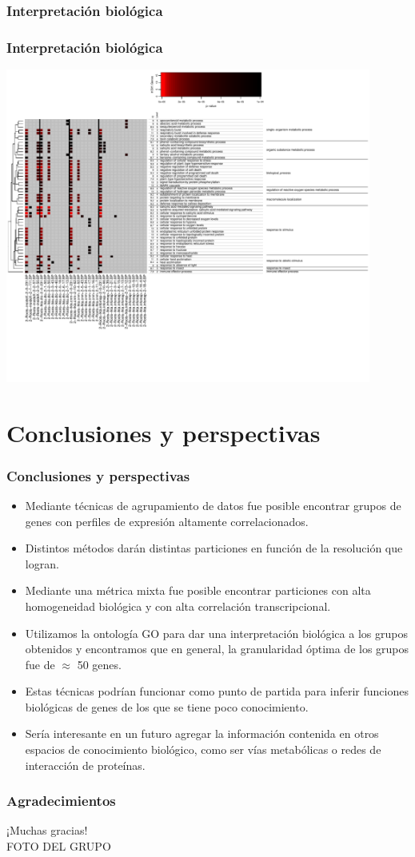 \documentclass[serif,9pt, t]{beamer}
\begin{document}
\subsubsection*{Interpretación biológica}
\begin{frame}\frametitle{Interpretación biológica} 
\centering
\includegraphics[width=0.9\textwidth]{fisher_grupo_2.pdf}
\end{frame}

\section{Conclusiones y perspectivas}
\begin{frame}\frametitle{Conclusiones y perspectivas}
\begin{itemize}
\item Mediante técnicas de agrupamiento de datos fue posible encontrar grupos de genes con perfiles de expresión altamente correlacionados.
\item Distintos métodos darán distintas particiones en función de la resolución que logran.
\item Mediante una métrica mixta fue posible encontrar particiones con alta homogeneidad biológica y con alta correlación transcripcional.
\item Utilizamos la ontología GO para dar una interpretación biológica a los grupos obtenidos y encontramos que en general, la granularidad óptima de los grupos fue de $\approx$ 50 genes.
\item Estas técnicas podrían funcionar como punto de partida para inferir funciones biológicas de genes de los que se tiene poco conocimiento.
\item Sería interesante en un futuro agregar la información contenida en otros espacios de conocimiento biológico, como ser vías metabólicas o redes de interacción de proteínas.
\end{itemize}
\end{frame}

\begin{frame}\frametitle{Agradecimientos}
\Large
\centering
¡Muchas gracias!\\
FOTO DEL GRUPO
\end{frame}
\end{document}

